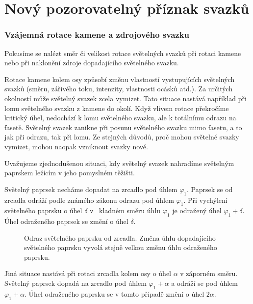 \part{Nový pozorovatelný příznak svazků}



\section{Vzájemná rotace kamene a zdrojového svazku}
Pokusíme se nalézt směr či velikost rotace světelných svazků při rotaci kamene nebo při naklonění zdroje dopadajícího světelného svazku. 

Rotace kamene kolem osy způsobí změnu vlastností vystupujících světelných svazků (směru, zářivého toku, intenzity, vlastnosti ocásků atd.). Za určitých okolností může světelný svazek zcela vymizet. Tato situace nastává například při lomu světelného svazku z kamene do okolí. Když vlivem rotace překročíme kritický úhel, nedochází k lomu světelného svazku, ale k totálnímu odrazu na fasetě. Světelný svazek zanikne při posunu světelného svazku mimo fasetu, a to jak při odrazu, tak při lomu. Ze stejných důvodů, proč mohou světelné svazky vymizet, mohou naopak vzniknout svazky nové.

Uvažujeme zjednodušenou situaci, kdy světelný svazek nahradíme světelným paprskem ležícím v jeho pomyslném těžišti. 

Světelný paprsek necháme dopadat na zrcadlo pod úhlem $\varphi_1$. Paprsek se od zrcadla odráží podle známého zákonu odrazu pod úhlem $\varphi_1$. Při vychýlení světelného paprsku o úhel $ \delta $ v~ kladném směru úhlu $\varphi_1$ je odražený úhel $\varphi_1 + \delta$. Úhel odraženého paprsek se změní o úhel $ \delta $.

\begin{figure}[h!]
\begin{center}
\scalebox{1}{ }
\end{center}
\caption[Odraz světelného paprsku od zrcadla.]{Odraz světelného paprsku od zrcadla. Změna úhlu dopadajícího světelného paprsku vyvolá stejně velkou změnu úhlu odraženého paprsku.}
\label{fig:odraz laser}
\end{figure}

Jiná situace nastává při rotaci zrcadla kolem osy o úhel $\alpha$ v záporném směru. Světelný paprsek dopadá na zrcadlo pod úhlem $\varphi_1 + \alpha$ a  odráží se pod úhlem $\varphi_1+\alpha$. Úhel odraženého paprsku se v tomto případě změní o úhel $2\alpha$. 

